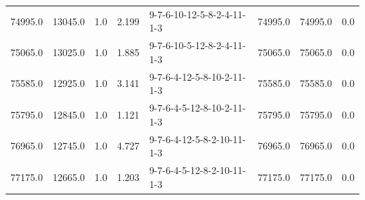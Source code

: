 \begin{tabular}{rrrrlrrr}
 74995.0 &  13045.0 &            1.0 &              2.199 &  9-7-6-10-12-5-8-2-4-11-1-3 &       74995.0 &         74995.0 &       0.0 \\
 75065.0 &  13025.0 &            1.0 &              1.885 &  9-7-6-10-5-12-8-2-4-11-1-3 &       75065.0 &         75065.0 &       0.0 \\
 75585.0 &  12925.0 &            1.0 &              3.141 &  9-7-6-4-12-5-8-10-2-11-1-3 &       75585.0 &         75585.0 &       0.0 \\
 75795.0 &  12845.0 &            1.0 &              1.121 &  9-7-6-4-5-12-8-10-2-11-1-3 &       75795.0 &         75795.0 &       0.0 \\
 76965.0 &  12745.0 &            1.0 &              4.727 &  9-7-6-4-12-5-8-2-10-11-1-3 &       76965.0 &         76965.0 &       0.0 \\
 77175.0 &  12665.0 &            1.0 &              1.203 &  9-7-6-4-5-12-8-2-10-11-1-3 &       77175.0 &         77175.0 &       0.0 \\
\bottomrule
\end{tabular}
